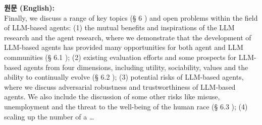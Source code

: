 \documentclass[12pt,a4paper]{article}
\begin{document}
\begin{mdframed}[style=orig]
\noindent\textbf{\small 원문 (English):}\\[2pt]
\small Finally, we discuss a range of key topics (§ 6 ) and open problems within the field of LLM-based agents: (1) the mutual benefits and inspirations of the LLM research and the agent research, where we demonstrate that the development of LLM-based agents has provided many opportunities for both agent and LLM communities (§ 6.1 ); (2) existing evaluation efforts and some prospects for LLM-based agents from four dimensions, including utility, sociability, values and the ability to continually evolve (§ 6.2 ); (3) potential risks of LLM-based agents, where we discuss adversarial robustness and trustworthiness of LLM-based agents. We also include the discussion of some other risks like misuse, unemployment and the threat to the well-being of the human race (§ 6.3 ); (4) scaling up the number of a \ldots
\end{mdframed}
\vspace{0.4em}
\end{document}
